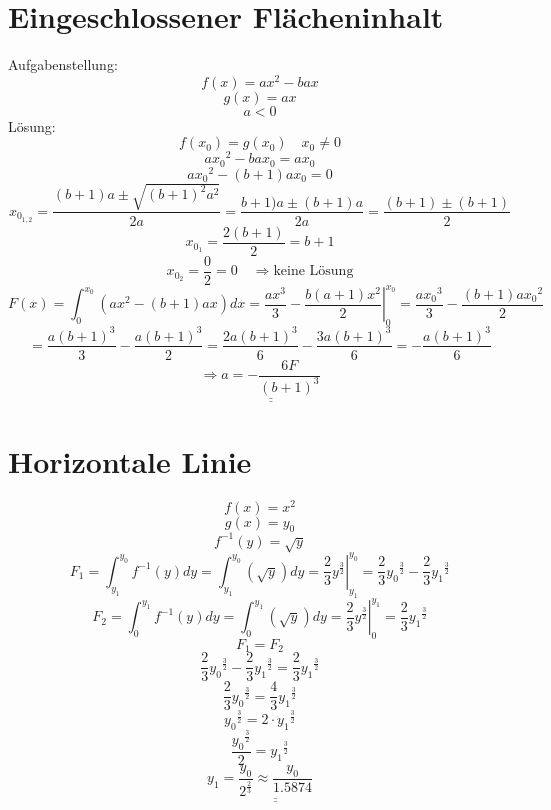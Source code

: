 \section{Eingeschlossener Flächeninhalt}
Aufgabenstellung: 
\[ f(x) = ax^2 - bax \]
\[ g(x) = ax \]
\[ a < 0 \]
Lösung: 
\[ f(x_0) = g(x_0) \quad x_0 \neq 0 \]
\[ a{x_0}^2 - bax_0 = ax_0 \]
\[ a{x_0}^2 - (b+1)ax_0 = 0 \]
\[ x_{0_{1,2}} = \frac{(b+1)a \pm \sqrt{(b+1)^2a^2}}{2a} = \frac{b+1)a \pm (b+1)a}{2a} = \frac{(b+1) \pm (b+1)}{2} \]
\[ x_{0_1} = \frac{2(b+1)}{2} = b+1 \]
\[ x_{0_2} = \frac{0}{2} = 0 \quad \Rightarrow \text{keine Lösung} \]
\[ F(x) = \int_0^{x_0} (ax^2 - (b+1)ax) dx = \left.\frac{ax^3}{3} - \frac{b(a+1)x^2}{2}\right|_0^{x_0} = \frac{a{x_0}^3}{3} - \frac{(b+1)a{x_0}^2}{2} \]
\[ = \frac{a{(b+1)}^3}{3} - \frac{a{(b+1)}^3}{2} = \frac{2a(b+1)^3}{6} - \frac{3a(b+1)^3}{6} = -\frac{a(b+1)^3}{6} \]
\[ \Rightarrow \underline{\underline{a = -\frac{6F}{(b+1)^3}}} \]

\section{Horizontale Linie}
\[ f(x) = x^2 \]
\[ g(x) = y_0 \]
\[ f^{-1}(y) = \sqrt{y} \]
\[ F_1 = \int_{y_1}^{y_0} f^{-1}(y) dy = \int_{y_1}^{y_0} \left(\sqrt{y}\right) dy = \left.\frac{2}{3} y^{\frac{3}{2}}\right|_{y_1}^{y_0} = \frac{2}{3}{y_0}^{\frac{3}{2}} - \frac{2}{3}{y_1}^{\frac{3}{2}} \]
\[ F_2 = \int_{0}^{y_1} f^{-1}(y) dy = \int_{0}^{y_1} \left(\sqrt{y}\right) dy = \left.\frac{2}{3} y^{\frac{3}{2}}\right|_{0}^{y_1} = \frac{2}{3}{y_1}^{\frac{3}{2}} \]
\[ F_1 = F_2 \]
\[ \frac{2}{3}{y_0}^{\frac{3}{2}} - \frac{2}{3}{y_1}^{\frac{3}{2}} = \frac{2}{3}{y_1}^{\frac{3}{2}} \]
\[ \frac{2}{3}{y_0}^{\frac{3}{2}} = \frac{4}{3}{y_1}^{\frac{3}{2}} \]
\[ {y_0}^{\frac{3}{2}} = 2 \cdot {y_1}^{\frac{3}{2}} \]
\[ \frac{{y_0}^{\frac{3}{2}}}{2} = {y_1}^{\frac{3}{2}} \]
\[ y_1 = \underline{\underline{\frac{y_0}{2^{\frac{2}{3}}} \approx \frac{y_0}{1.5874}}} \]
\[  \]


